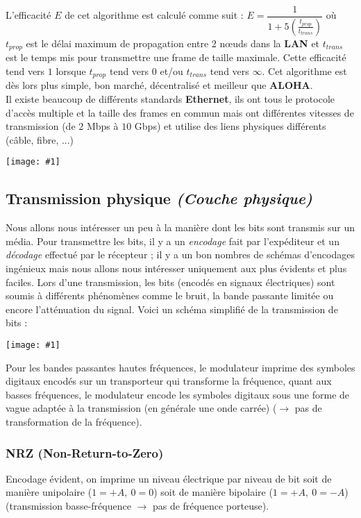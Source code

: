 \documentclass{article}
\newcommand{\imgR}[2]{\begin{center}\texttt{[image: \#1]}\end{center}}
\newcommand{\neuSPs}{n\oe uds }
\begin{document}
\noindent L'efficacité $E$ de cet algorithme est calculé comme suit : $E = \dfrac{1}{1+5\left( \frac{t_{prop}}
{t_{trans}} \right)}$ où $t_{prop}$ est le délai maximum de propagation entre 2 \neuSPs dans la \textbf{LAN} et 
$t_{trans}$ est le temps mis pour transmettre une frame de taille maximale. Cette efficacité tend vers $1$ 
lorsque $t_{prop}$ tend vers $0$ et/ou $t_{trans}$ tend vers $\infty$. Cet algorithme est dès lors plus simple, 
bon marché, décentralisé et meilleur que \textbf{ALOHA}. \\

\noindent Il existe beaucoup de différents standards \textbf{Ethernet}, ils ont tous le protocole d'accès 
multiple et la taille des frames en commun mais ont différentes vitesses de transmission (de $2$ Mbps à $10$ 
Gbps) et utilise des liens physiques différents (câble, fibre, ...)

\imgR{CN_117.png}{275}

\subsection{Transmission physique \textit{(Couche physique)}}

Nous allons nous intéresser un peu à la manière dont les bits sont transmis sur un média. Pour transmettre les 
bits, il y a un \textit{encodage} fait par l'expéditeur et un \textit{décodage} effectué par le récepteur ; il y 
a un bon nombres de schémas d'encodages ingénieux mais nous allons nous intéresser uniquement aux plus évidents 
et plus faciles. Lors d'une transmission, les bits (encodés en signaux électriques) sont soumis à différents 
phénomènes comme le bruit, la bande passante limitée ou encore l'atténuation du signal. Voici un schéma simplifié
de la transmission de bits :

\imgR{CN_118.png}{225}

Pour les bandes passantes hautes fréquences, le modulateur imprime des symboles digitaux encodés sur un 
transporteur qui transforme la fréquence, quant aux basses fréquences, le modulateur encode les symboles digitaux 
sous une forme de vague adaptée à la transmission (en générale une onde carrée) ($\rightarrow$ pas de 
transformation de la fréquence).

\subsubsection{NRZ (Non-Return-to-Zero)}

Encodage évident, on imprime un niveau électrique par niveau de bit soit de manière unipolaire ($1=+A,\ 0=0$) 
soit de manière bipolaire ($1=+A,\ 0=-A$) (transmission basse-fréquence $\rightarrow$ pas de fréquence porteuse).
\end{document}
